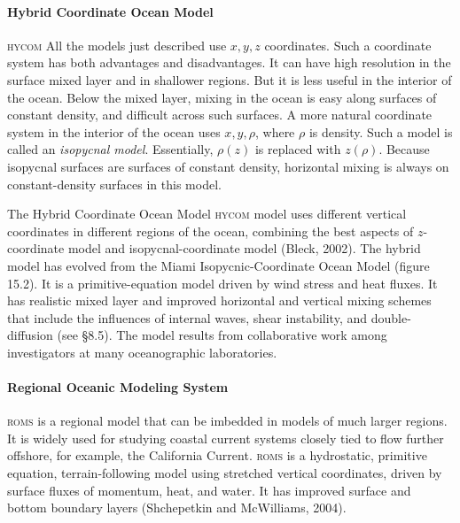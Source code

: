\paragraph{Hybrid Coordinate Ocean Model}
\textsc{hycom} All the models just
described use $x, y, z$ coordinates. Such a coordinate system has both
advantages and disadvantages. It can have high resolution in the
surface mixed layer and in shallower regions. But it is less useful in
the interior of the ocean. Below the mixed layer,
mixing in the ocean is
easy along surfaces of constant density, and difficult across such
surfaces. A more natural coordinate system in the interior of the
ocean uses $x, y, \rho$, where $\rho$ is density. Such a model is
called an \textit{isopycnal model}. Essentially, $\rho (z)$ is replaced with
$z (\rho )$. Because isopycnal surfaces are surfaces of constant
density, horizontal mixing is always
on constant-density surfaces in this model.

The Hybrid Coordinate Ocean Model \textsc{hycom} model uses different
vertical coordinates in different regions of the ocean, combining the
best aspects of $z$-coordinate model and isopycnal-coordinate model
(Bleck, 2002). The hybrid model has evolved from the Miami
Isopycnic-Coordinate Ocean Model (figure 15.2). It is a
primitive-equation model driven by wind stress and heat fluxes. It has realistic
mixed layer and improved horizontal and vertical mixing schemes that
include the influences of internal waves, shear instability, and
double-diffusion (see \S 8.5). The model results from collaborative
work among investigators at many oceanographic laboratories.

\paragraph{Regional Oceanic Modeling System}
\textsc{roms} is a regional model that can be imbedded in models of
much larger regions. It is widely used for studying coastal current
systems closely tied to flow further offshore, for example, the
California Current. \textsc{roms} is a hydrostatic, primitive
equation, terrain-following model using stretched vertical
coordinates, driven by surface fluxes of momentum, heat, and water. It
has improved surface and bottom boundary layers (Shchepetkin and
McWilliams, 2004).

